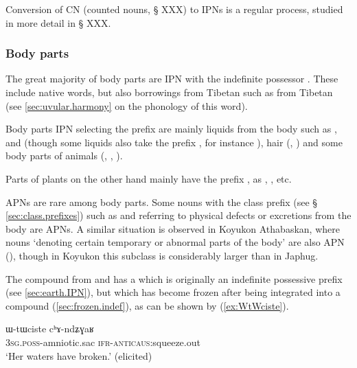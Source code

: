 Conversion of CN (counted nouns, § XXX) to IPNs is a regular process, studied in more detail in § XXX.

\subsubsection{Body parts} \label{sec:body.part}
The great majority of body parts are IPN with the indefinite possessor . These include native words, but also borrowings from Tibetan such as  from Tibetan  (see \ref{sec:uvular.harmony} on the phonology of this word).

Body parts IPN selecting the prefix  are mainly liquids from the body such as ,  and  (though some liquids also take the prefix , for instance ), hair (, ) and some body parts of animals (, , ).

Parts of plants on the other hand mainly have the prefix , as , ,  etc.

APNs are rare among body parts. Some nouns with the  class prefix (see § \ref{sec:class.prefixes}) such as  and  referring to physical defects or excretions from the body are APNs. A similar situation is observed in Koyukon Athabaskan, where nouns `denoting certain temporary or abnormal parts of the body' are also APN (\citealt[660]{thompson96koyukon}), though in Koyukon this subclass is considerably larger than in Japhug.

The compound  from  and  has a  which is originally an indefinite possessive prefix (see \ref{sec:earth.IPN}), but which has become frozen after being integrated into a compound (\ref{sec:frozen.indef}), as can be shown by (\ref{ex:WtWciste}). 

\begin{exe}
\ex \label{ex:WtWciste}
\gll ɯ-tɯciste cʰɤ-ndʑɣaʁ \\
\textsc{3sg.poss}-amniotic.sac \textsc{ifr}-\textsc{anticaus}:squeeze.out \\
\glt `Her waters have broken.' (elicited)
\end{exe}


